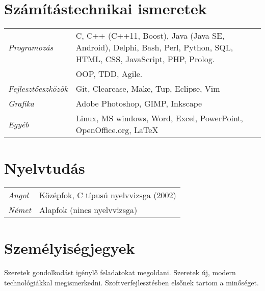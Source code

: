 \documentclass[a4paper,10pt]{article}
\newcommand{\pont}[1]{\emph{#1}}
\begin{document}
\section*{Számítástechnikai ismeretek}
\begin{tabular}{lp{12cm}}
 \pont{Programozás}&C, C++ (C++11, Boost), Java (Java SE, Android), Delphi, Bash, Perl, Python, SQL, HTML, CSS, JavaScript, PHP, Prolog.\\
 &OOP, TDD, Agile.\\
 \pont{Fejlesztőeszközök}&Git, Clearcase, Make, Tup, Eclipse, Vim\\
 \pont{Grafika}&Adobe Photoshop, GIMP, Inkscape\\
 \pont{Egyéb}&Linux, MS windows, Word, Excel, PowerPoint, OpenOffice.org, LaTeX
\end{tabular}

\section*{Nyelvtudás}
\begin{tabular}{ll}
 \pont{Angol}&Középfok, C típusú nyelvvizsga (2002)\\
 \pont{Német}&Alapfok (nincs nyelvvizsga)
\end{tabular}

\section*{Személyiségjegyek}
Szeretek gondolkodást igénylő feladatokat megoldani. Szeretek új, modern technológiákkal megismerkedni. Szoftverfejlesztésben elsőnek tartom a minőséget.
\end{document}

